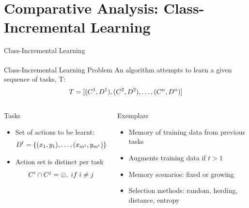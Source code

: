 \documentclass[aspectratio=169, xcolor=dvipsnames]{beamer}
\begin{document}
\section{Comparative Analysis: Class-Incremental Learning}

\begin{frame}{Class-Incremental Learning}
      \framesubtitle{}%
      
      \begin{block}{Class-Incremental Learning Problem}
            \small An algorithm attempts to learn a given sequence of tasks, T:
            \begin{equation}
            \centering
            T = [ (C^1, D^1), (C^2, D^2), \ldots ,(C^n, D^n) ]
            \end{equation}
      \end{block}
      \vfill
      \begin{columns}
      
      \begin{block}{Tasks}
            \small
            \begin{itemize}
            \item Set of actions to be learnt:
            \begin{equation}
            \centering
            D^t = \{ (x_1, y_1), \ldots, (x_{m^t}, y_{m^t}) \}
            \end{equation}
            \item Action set is distinct per task
            \begin{equation}
            \centering
            C^i \cap C^j = \oslash, \; if \; i \ne j
            \end{equation}
            \end{itemize}
      \end{block}
      
      
      \begin{block}{Exemplars}
            \small
            \begin{itemize}
            \item Memory of training data from previous tasks
            \item Augments training data if $t > 1$
            \item Memory scenarios: fixed or growing
            \item Selection methods: random, herding, distance, entropy
            \end{itemize}
      \end{block}
      
      \end{columns}
\end{frame}
\end{document}
